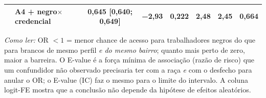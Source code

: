 \begin{table}[!ht]
{\begin{tabular}{llcccccc}
 & A4 + negro$\times$credencial & 0,645 [0,640; 0,649] & −2,93 & 0,222 & 2,48 & 2,45 & 0,664 \\
\bottomrule
\end{tabular}}
\par\smallskip
\footnotesize\emph{Como ler:} OR $<1$ = menor chance de acesso para trabalhadores negros do que para brancos de mesmo perfil \emph{e do mesmo bairro}; quanto mais perto de zero, maior a barreira. O E-value é a força mínima de associação (razão de risco) que um confundidor não observado precisaria ter com a raça \emph{e} com o desfecho para anular o OR; o E-value (IC) faz o mesmo para o limite do intervalo. A coluna logit-FE mostra que a conclusão não depende da hipótese de efeitos aleatórios.
\end{table}
